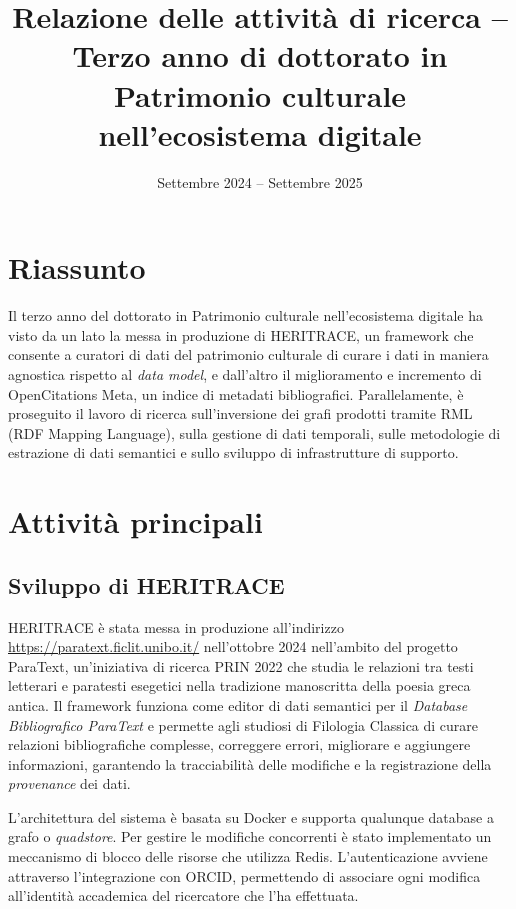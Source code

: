 \documentclass[11pt,a4paper]{article}
\title{Relazione delle attività di ricerca -- Terzo anno di dottorato in Patrimonio culturale nell'ecosistema digitale}
\author{Settembre 2024 -- Settembre 2025}
\date{}
\begin{document}
\maketitle

\section{Riassunto}

Il terzo anno del dottorato in Patrimonio culturale nell'ecosistema digitale ha visto da un lato la messa in produzione di HERITRACE, un framework che consente a curatori di dati del patrimonio culturale di curare i dati in maniera agnostica rispetto al \textit{data model}, e dall'altro il miglioramento e incremento di OpenCitations Meta, un indice di metadati bibliografici. Parallelamente, è proseguito il lavoro di ricerca sull'inversione dei grafi prodotti tramite RML (RDF Mapping Language), sulla gestione di dati temporali, sulle metodologie di estrazione di dati semantici e sullo sviluppo di infrastrutture di supporto.

\section{Attività principali}

\subsection{Sviluppo di HERITRACE}

HERITRACE è stata messa in produzione all'indirizzo \url{https://paratext.ficlit.unibo.it/} nell'ottobre 2024 nell'ambito del progetto ParaText, un'iniziativa di ricerca PRIN 2022 che studia le relazioni tra testi letterari e paratesti esegetici nella tradizione manoscritta della poesia greca antica. Il framework funziona come editor di dati semantici per il \textit{Database Bibliografico ParaText} e permette agli studiosi di Filologia Classica di curare relazioni bibliografiche complesse, correggere errori, migliorare e aggiungere informazioni, garantendo la tracciabilità delle modifiche e la registrazione della \textit{provenance} dei dati.

L'architettura del sistema è basata su Docker e supporta qualunque database a grafo o \textit{quadstore}. Per gestire le modifiche concorrenti è stato implementato un meccanismo di blocco delle risorse che utilizza Redis. L'autenticazione avviene attraverso l'integrazione con ORCID, permettendo di associare ogni modifica all'identità accademica del ricercatore che l'ha effettuata.
\end{document}
